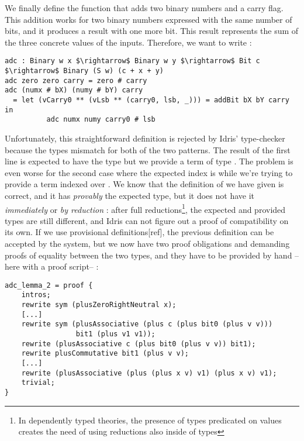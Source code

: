 We finally define the function  that adds two binary numbers and a carry flag. This addition works for two binary numbers expressed with the same number of bits, and it produces a result with one more bit. This result represents the sum of the three concrete values of the inputs. Therefore, we want to write :

\begin{lstlisting}
adc : Binary w x $\rightarrow$ Binary w y $\rightarrow$ Bit c $\rightarrow$ Binary (S w) (c + x + y)
adc zero zero carry = zero # carry
adc (numx # bX) (numy # bY) carry
  = let (vCarry0 ** (vLsb ** (carry0, lsb, _))) = addBit bX bY carry in
          adc numx numy carry0 # lsb
\end{lstlisting}

Unfortunately, this straightforward definition is rejected by Idris' type-checker because the types mismatch for both of the two patterns. The result of the first line  is expected to have the type  but we provide a term of type .
The problem is even worse for the second case where the expected index is 
while we're trying to provide a term indexed over
.
We know that the definition of  we have given is correct, and it has \emph{provably} the expected type, but it does not have it \emph{immediately} or \emph{by reduction} : after full reductions\footnote{In dependently typed theories, the presence of types predicated on values creates the need of using reductions also inside of types}, the expected and provided types are still different, and Idris can not figure out a proof of compatibility on its own. 
If we use provisional definitions[ref], the previous definition can be accepted by the system, but we now have two proof obligations  and  demanding proofs of equality between the two types, and they have to be provided by hand --here with a proof script-- :

\begin{lstlisting}
adc_lemma_2 = proof {
    intros;
    rewrite sym (plusZeroRightNeutral x);
    [...]
    rewrite sym (plusAssociative (plus c (plus bit0 (plus v v))) 
                 bit1 (plus v1 v1));
    rewrite (plusAssociative c (plus bit0 (plus v v)) bit1);
    rewrite plusCommutative bit1 (plus v v);
    [...]
    rewrite (plusAssociative (plus (plus x v) v1) (plus x v) v1);
    trivial;
}
\end{lstlisting}

